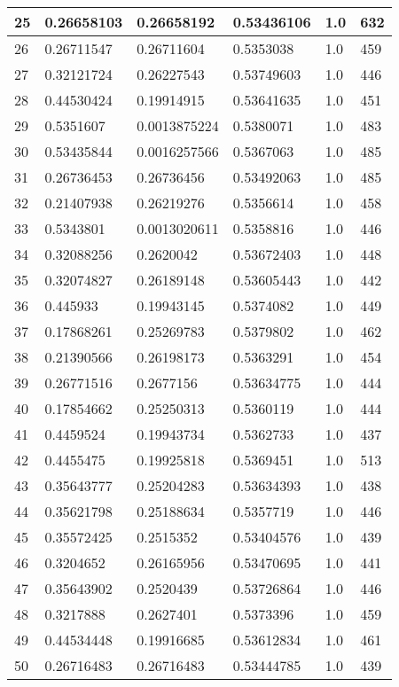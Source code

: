 \begin{longtable}{|l|l|l|l|l|l|}
25 & 0.26658103 & 0.26658192 & 0.53436106 & 1.0 & 632 \\ \hline 
26 & 0.26711547 & 0.26711604 & 0.5353038 & 1.0 & 459 \\ \hline 
27 & 0.32121724 & 0.26227543 & 0.53749603 & 1.0 & 446 \\ \hline 
28 & 0.44530424 & 0.19914915 & 0.53641635 & 1.0 & 451 \\ \hline 
29 & 0.5351607 & 0.0013875224 & 0.5380071 & 1.0 & 483 \\ \hline 
30 & 0.53435844 & 0.0016257566 & 0.5367063 & 1.0 & 485 \\ \hline 
31 & 0.26736453 & 0.26736456 & 0.53492063 & 1.0 & 485 \\ \hline 
32 & 0.21407938 & 0.26219276 & 0.5356614 & 1.0 & 458 \\ \hline 
33 & 0.5343801 & 0.0013020611 & 0.5358816 & 1.0 & 446 \\ \hline 
34 & 0.32088256 & 0.2620042 & 0.53672403 & 1.0 & 448 \\ \hline 
35 & 0.32074827 & 0.26189148 & 0.53605443 & 1.0 & 442 \\ \hline 
36 & 0.445933 & 0.19943145 & 0.5374082 & 1.0 & 449 \\ \hline 
37 & 0.17868261 & 0.25269783 & 0.5379802 & 1.0 & 462 \\ \hline 
38 & 0.21390566 & 0.26198173 & 0.5363291 & 1.0 & 454 \\ \hline 
39 & 0.26771516 & 0.2677156 & 0.53634775 & 1.0 & 444 \\ \hline 
40 & 0.17854662 & 0.25250313 & 0.5360119 & 1.0 & 444 \\ \hline 
41 & 0.4459524 & 0.19943734 & 0.5362733 & 1.0 & 437 \\ \hline 
42 & 0.4455475 & 0.19925818 & 0.5369451 & 1.0 & 513 \\ \hline 
43 & 0.35643777 & 0.25204283 & 0.53634393 & 1.0 & 438 \\ \hline 
44 & 0.35621798 & 0.25188634 & 0.5357719 & 1.0 & 446 \\ \hline 
45 & 0.35572425 & 0.2515352 & 0.53404576 & 1.0 & 439 \\ \hline 
46 & 0.3204652 & 0.26165956 & 0.53470695 & 1.0 & 441 \\ \hline 
47 & 0.35643902 & 0.2520439 & 0.53726864 & 1.0 & 446 \\ \hline 
48 & 0.3217888 & 0.2627401 & 0.5373396 & 1.0 & 459 \\ \hline 
49 & 0.44534448 & 0.19916685 & 0.53612834 & 1.0 & 461 \\ \hline 
50 & 0.26716483 & 0.26716483 & 0.53444785 & 1.0 & 439 \\ \hline 
\end{longtable}